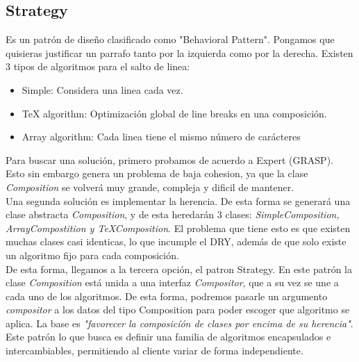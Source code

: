 \documentclass[11pt]{article}
\theoremstyle{plain}
\begin{document}
        \subsection{Strategy} %
        \label{sub:strategy}
            Es un patrón de diseño clasificado como "Behavioral Pattern". Pongamos que quisieras justificar un parrafo tanto por la izquierda como por la derecha. Existen 3 tipos de algoritmos para el salto de linea:
            \begin{itemize}
                \item Simple: Considera una linea cada vez.
                \item TeX algorithm: Optimización global de line breaks en una composición.
                \item Array algorithm: Cada linea tiene el mismo número de carácteres
            \end{itemize}
            Para buscar una solución, primero probamos de acuerdo a Expert (GRASP). Esto sin embargo genera un problema de baja cohesion, ya que la clase \textit{Composition} se volverá muy grande, compleja y dificil de mantener.\\

            Una segunda solución es implementar la herencia. De esta forma se generará una clase abstracta \textit{Composition}, y de esta heredarán 3 clases: \textit{SimpleComposition, ArrayCompostition y TeXComposition}. El problema que tiene esto es que existen muchas clases casi identicas, lo que incumple el DRY, además de que solo existe un algoritmo fijo para cada composición.\\

            De esta forma, llegamos a la tercera opción, el patron Strategy. En este patrón la clase \textit{Composition} está unida a una interfaz \textit{Compositor}, que a su vez se une a cada uno de los algoritmos. De esta forma, podremos pasarle un argumento \textit{compositor} a los datos del tipo Composition para poder escoger que algoritmo se aplica. La base es \textit{"favorecer la composicíón de clases por encima de su herencia"}. Este patrón lo que busca es definir una familia de algoritmos encapsulados e intercambiables, permitiendo al cliente variar de forma independiente.\\
\end{document}
